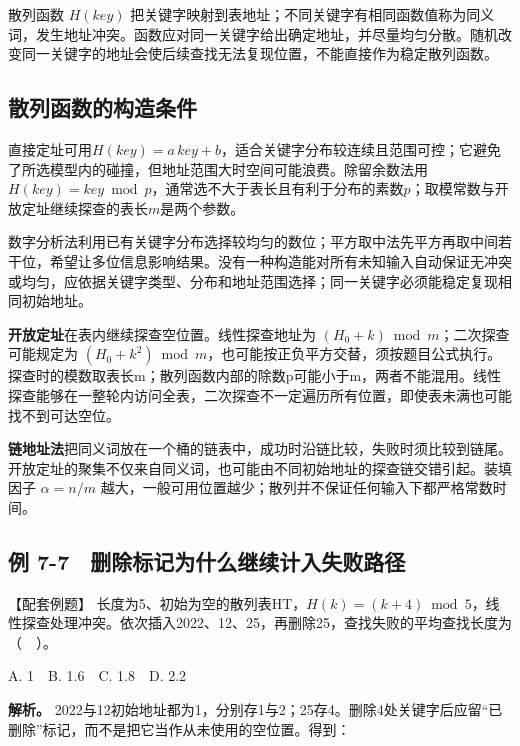 散列函数 \(H(key)\) 把关键字映射到表地址；不同关键字有相同函数值称为同义词，发生地址冲突。函数应对同一关键字给出确定地址，并尽量均匀分散。随机改变同一关键字的地址会使后续查找无法复现位置，不能直接作为稳定散列函数。

\subsection{散列函数的构造条件}\label{DS07-hash-functions}

直接定址可用\(H(key)=a\,key+b\)，适合关键字分布较连续且范围可控；它避免了所选模型内的碰撞，但地址范围大时空间可能浪费。除留余数法用\(H(key)=key\bmod p\)，通常选不大于表长且有利于分布的素数\(p\)；取模常数与开放定址继续探查的表长\(m\)是两个参数。

数字分析法利用已有关键字分布选择较均匀的数位；平方取中法先平方再取中间若干位，希望让多位信息影响结果。没有一种构造能对所有未知输入自动保证无冲突或均匀，应依据关键字类型、分布和地址范围选择；同一关键字必须能稳定复现相同初始地址。

\textbf{开放定址}在表内继续探查空位置。线性探查地址为 \((H_0+k)\bmod m\)；二次探查可能规定为 \((H_0+k^2)\bmod m\)，也可能按正负平方交替，须按题目公式执行。探查时的模数取表长m；散列函数内部的除数p可能小于m，两者不能混用。线性探查能够在一整轮内访问全表，二次探查不一定遍历所有位置，即使表未满也可能找不到可达空位。

\textbf{链地址法}把同义词放在一个桶的链表中，成功时沿链比较，失败时须比较到链尾。开放定址的聚集不仅来自同义词，也可能由不同初始地址的探查链交错引起。装填因子 \(\alpha=n/m\) 越大，一般可用位置越少；散列并不保证任何输入下都严格常数时间。

\subsection{例 7-7　删除标记为什么继续计入失败路径}\label{DS07-ex7}

\begin{example}[配套案例]

【配套例题】 长度为5、初始为空的散列表HT，\(H(k)=(k+4)\bmod5\)，线性探查处理冲突。依次插入2022、12、25，再删除25，查找失败的平均查找长度为（　）。

A. 1　B. 1.6　C. 1.8　D. 2.2

\end{example}

\textbf{解析。} 2022与12初始地址都为1，分别存1与2；25存4。删除4处关键字后应留``已删除''标记，而不是把它当作从未使用的空位置。得到：

